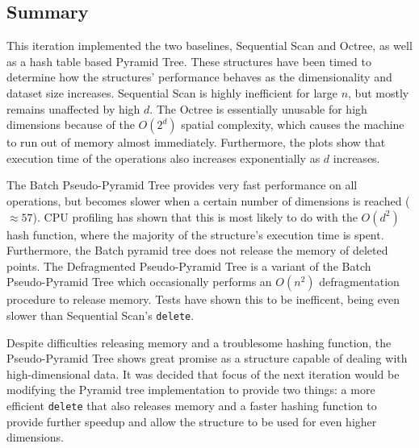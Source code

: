 \subsection{Summary}

This iteration implemented the two baselines, Sequential Scan and Octree, as well as a hash table based Pyramid Tree. These structures have been timed to determine how the structures' performance behaves as the dimensionality and dataset size increases. Sequential Scan is highly inefficient for large $n$, but mostly remains unaffected by high $d$. The Octree is essentially unusable for high dimensions because of the $O(2^d)$ spatial complexity, which causes the machine to run out of memory almost immediately. Furthermore, the plots show that execution time of the operations also increases exponentially as $d$ increases.

The Batch Pseudo-Pyramid Tree provides very fast performance on all operations, but becomes slower when a certain number of dimensions is reached ($\approx 57$). CPU profiling has shown that this is most likely to do with the $O(d^2)$ hash function, where the majority of the structure's execution time is spent. Furthermore, the Batch pyramid tree does not release the memory of deleted points. The Defragmented Pseudo-Pyramid Tree is a variant of the Batch Pseudo-Pyramid Tree which occasionally performs an $O(n^2)$ defragmentation procedure to release memory. Tests have shown this to be inefficent, being even slower than Sequential Scan's \texttt{delete}.

Despite difficulties releasing memory and a troublesome hashing function, the Pseudo-Pyramid Tree shows great promise as a structure capable of dealing with high-dimensional data. It was decided that focus of the next iteration would be modifying the Pyramid tree implementation to provide two things: a more efficient \texttt{delete} that also releases memory and a faster hashing function to provide further speedup and allow the structure to be used for even higher dimensions.